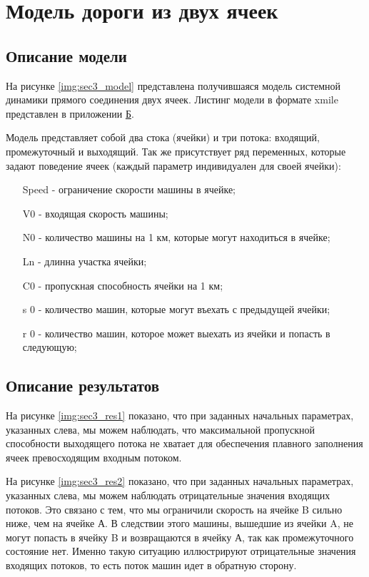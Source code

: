 \section{Модель дороги из двух ячеек}

\subsection{Описание модели}

На рисунке \ref{img:sec3_model} представлена получившаяся модель системной динамики прямого соединения двух ячеек. Листинг модели в формате xmile представлен в приложении \hyperlink{app-b}{Б}.

Модель представляет собой два стока (ячейки) и три потока: входящий, промежуточный и выходящий.
Так же присутствует ряд переменных, которые задают поведение ячеек (каждый параметр индивидуален для своей ячейки):
\begin{itemize}
    \item[Speed] - ограничение скорости машины в ячейке;
    \item[V0] - входящая скорость машины;
    \item[N0] - количество машины на 1 км, которые могут находиться в ячейке;
    \item[Ln] - длинна участка ячейки;
    \item[C0] - пропускная способность ячейки на 1 км;
    \item[s 0] - количество машин, которые могут въехать с предыдущей ячейки;
    \item[r 0] - количество машин, которое может выехать из ячейки и попасть в следующую;
\end{itemize}


\subsection{Описание результатов}

На рисунке \ref{img:sec3_res1} показано, что при заданных начальных параметрах, указанных слева, мы можем наблюдать, что максимальной пропускной способности выходящего потока не хватает для обеспечения плавного заполнения ячеек превосходящим входным потоком.


На рисунке \ref{img:sec3_res2} показано, что при заданных начальных параметрах, указанных слева, мы можем наблюдать отрицательные значения входящих потоков. Это связано с тем, что мы ограничили скорость на ячейке B сильно ниже, чем на ячейке А. В следствии этого машины, вышедшие из ячейки A, не могут попасть в ячейку B и возвращаются в ячейку А, так как промежуточного состояние нет. Именно такую ситуацию иллюстрируют отрицательные значения входящих потоков, то есть поток машин идет в обратную сторону.

